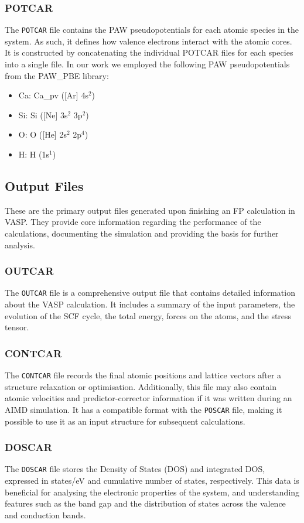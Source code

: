 \subsubsection{POTCAR}
The \texttt{POTCAR} file contains the PAW pseudopotentials for each atomic species in the system. As such, it defines how valence electrons interact with the atomic cores. It is constructed by concatenating the individual POTCAR files for each species into a single file. In our work we employed the following PAW pseudopotentials from the PAW\_PBE library:
\begin{itemize}
    \item Ca: Ca\_pv ([Ar] 4s$^2$)
    \item Si: Si ([Ne] 3s$^2$ 3p$^2$)
    \item O: O ([He] 2s$^2$ 2p$^4$)
    \item H: H (1s$^1$)
\end{itemize}

\subsection{Output Files}
These are the primary output files generated upon finishing an FP calculation in VASP. They provide core information regarding the performance of the calculations, documenting the simulation and providing the basis for further analysis.
\subsubsection{OUTCAR}
The \texttt{OUTCAR} file is a comprehensive output file that contains detailed information about the VASP calculation. It includes a summary of the input parameters, the evolution of the SCF cycle, the total energy, forces on the atoms, and the stress tensor.
\subsubsection{CONTCAR}
The \texttt{CONTCAR} file records the final atomic positions and lattice vectors after a structure relaxation or optimisation. Additionally, this file may also contain atomic velocities and predictor-corrector information if it was written during an AIMD simulation. It has a compatible format with the \texttt{POSCAR} file, making it possible to use it as an input structure for subsequent calculations.

\subsubsection{DOSCAR}
The \texttt{DOSCAR} file stores the Density of States (DOS) and integrated DOS, expressed in states/eV and cumulative number of states, respectively. This data is beneficial for analysing the electronic properties of the system, and understanding features such as the band gap and the distribution of states across the valence and conduction bands. 
